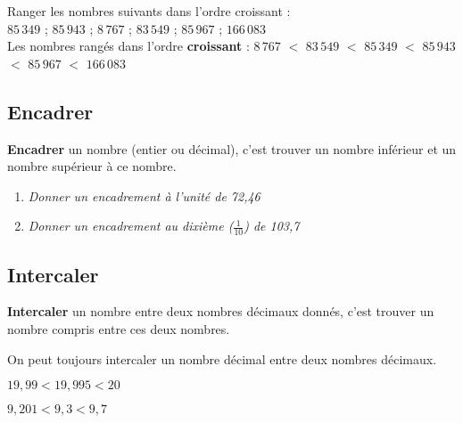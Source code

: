 \documentclass[11pt]{article}
\begin{document}
\begin{exemple}
Ranger les nombres suivants dans l'ordre croissant :\\
  \hfill $85\,349$ \hfill  ;  \hfill $85\,943$ \hfill ;  \hfill $8\,767$  \hfill ;  \hfill $83\,549$  \hfill ; \hfill  $85\,967$ \hfill  ;  \hfill $166\,083$ \hfill \\
  Les nombres rangés dans l'ordre {\bfseries croissant} : $8\,767$ $<$
  $83\,549$ $<$ $85\,349$ $<$ $85\,943$ $<$ $85\,967$ $<$ $166\,083$
\end{exemple}

\subsection{Encadrer}

\begin{definition}
\textbf{Encadrer} un nombre (entier ou décimal), c'est trouver un
  nombre inférieur et un nombre supérieur à ce nombre.
\end{definition}


\begin{exercice}
  \begin{enumerate}
  \item \textit{Donner un encadrement à l'unité de 72,46}
    
  \item \textit{Donner un encadrement au dixième ($\frac{1}{10}$) de
    103,7}
  \end{enumerate}
\end{exercice}
\newpage
\subsection{Intercaler}
\begin{definition}
  \textbf{Intercaler} un nombre entre deux nombres décimaux donnés,
  c'est trouver un nombre compris entre ces deux nombres.
\end{definition}

\begin{propriete}
On peut toujours intercaler un nombre décimal entre deux nombres décimaux.
\end{propriete}

\begin{exemple}
  \begin{enu}
  \item $19{,}99<19{,}995<20$
  \item $9{,}201<9{,}3<9{,}7$
  \end{enu}
\end{exemple}
\end{document}
